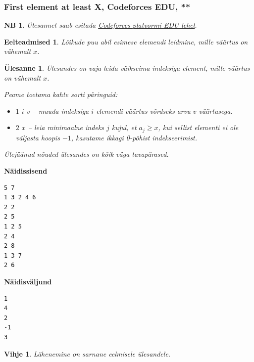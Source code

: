 \documentclass{trkut}
\newtheorem*{prereq}{Eelteadmised}
\newtheorem*{extra}{NB}
\newtheorem*{vihje}{Vihje}
\newtheorem*{Text}{Ülesanne}
\begin{document}
\subsubsection{First element at least X, Codeforces EDU, **}
\begin{extra}
Ülesannet saab esitada \href{https://codeforces.com/edu/course/2/lesson/4/2/practice/contest/273278/problem/C}{Codeforces platvormi EDU lehel}.
\end{extra}
\begin{prereq}
Lõikude puu abil esimese elemendi leidmine, mille väärtus on vähemalt $x$.
\end{prereq}
\begin{Text}
Ülesandes on vaja leida väikseima indeksiga element, mille väärtus on vähemalt $x$.

Peame toetama kahte sorti päringuid:
\begin{itemize}
    \item $1$ $i$ $v$ -- muuda indeksiga $i$ elemendi väärtus võrdseks arvu $v$ väärtusega.
    \item $2$ $x$ -- leia minimaalne indeks $j$ kujul, et $a_j\geq x$, kui sellist elementi ei ole väljasta hoopis $-1$, kasutame ikkagi 0-põhist indekseerimist. 
\end{itemize}

Ülejäänud nõuded ülesandes on kõik väga tavapärased.

\parencite{14.1}
\end{Text}



\textbf{Näidissisend}

\begin{verbatim}
5 7
1 3 2 4 6
2 2
2 5
1 2 5
2 4
2 8
1 3 7
2 6
\end{verbatim}

\textbf{Näidisväljund}

\begin{verbatim}
1
4
2
-1
3
\end{verbatim}


\begin{vihje}
Lähenemine on sarnane eelmisele ülesandele.
\end{vihje}
\end{document}
